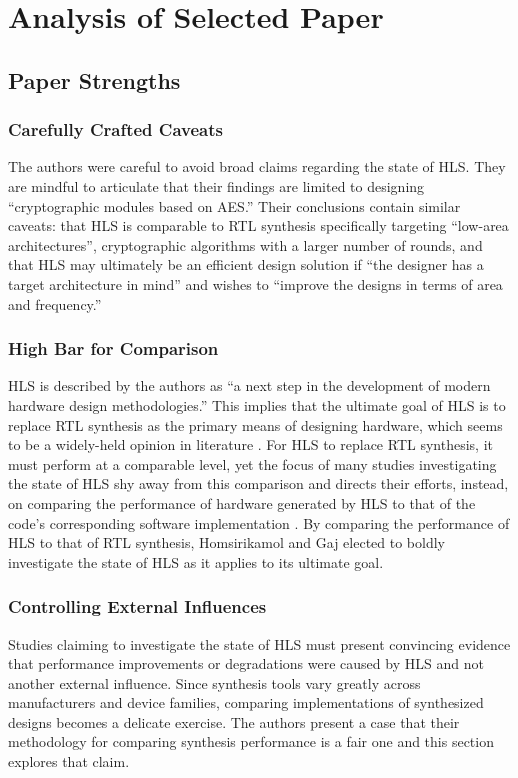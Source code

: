 \documentclass[12pt,journal,compsoc,onecolumn]{IEEEtran}
\begin{document}
\section{Analysis of Selected Paper}
\subsection{Paper Strengths}
\subsubsection{Carefully Crafted Caveats}
The authors were careful to avoid broad claims regarding the state of HLS. They are mindful to articulate that their findings are limited to designing ``cryptographic modules based on AES.'' Their conclusions contain similar caveats: that HLS is comparable to RTL synthesis specifically targeting ``low-area architectures'', cryptographic algorithms with a larger number of rounds, and that HLS may ultimately be an efficient design solution if ``the designer has a target architecture in mind'' and wishes to ``improve the designs in terms of area and frequency.''
\subsubsection{High Bar for Comparison}\label{sec:highbar}

HLS is described by the authors as ``a next step in the development of modern hardware design methodologies.'' This implies that the ultimate goal of HLS is to replace RTL synthesis as the primary means of designing hardware, which seems to be a widely-held opinion in literature \cite{1}\cite{3}\cite{4}. For HLS to replace RTL synthesis, it must perform at a comparable level, yet the focus of many studies investigating the state of HLS shy away from this comparison and directs their efforts, instead, on comparing the performance of hardware generated by HLS to that of the code's corresponding software implementation \cite{3}\cite{4}\cite{skalicky}. By comparing the performance of HLS to that of RTL synthesis, Homsirikamol and Gaj elected to boldly investigate the state of HLS as it applies to its ultimate goal. 

\subsubsection{Controlling External Influences}
Studies claiming to investigate the state of HLS must present convincing evidence that performance improvements or degradations were caused by HLS and not another external influence. Since synthesis tools vary greatly across manufacturers and device families, comparing implementations of synthesized designs becomes a delicate exercise. The authors present a case that their methodology for comparing synthesis performance is a fair one and this section explores that claim.
\end{document}
